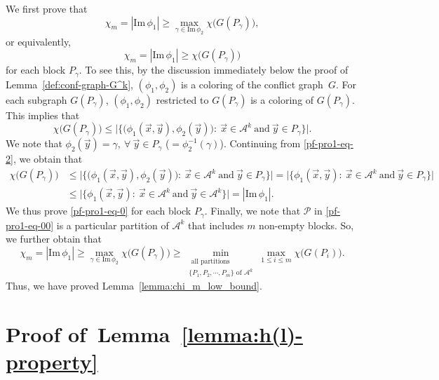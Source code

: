 \documentclass[11pt,draftclsnofoot,onecolumn]{IEEEtran}
\def\Im{\mathrm{Im}}
\begin{document}
 We  first prove that
 \begin{equation*}
\chi_m=|\Im\,\phi_{1}|\geq\max_{\gamma\in\Im\,\phi_{2}}\chi\big(G(P_{\gamma})\big),\label{pf-pro1-eq-1}
\end{equation*}
 or equivalently,
 \begin{equation}
 \chi_m=|\Im\,\phi_{1}|\geq\chi\big(G(P_{\gamma})\big)\label{pf-pro1-eq-0}
 \end{equation}
for each block $P_{\gamma}$. To see this, by the discussion immediately below the  proof of Lemma~\ref{def:conf-graph-G^k},
$(\phi_1,\phi_2)$ is a coloring of the conflict graph~$G$.
 For each subgraph $G(P_{\gamma})$, $(\phi_1,\phi_2)$ restricted to $G(P_{\gamma})$ is a coloring of $G(P_{\gamma})$. This implies that
\begin{equation}
\chi\big(G(P_{\gamma})\big)\leq\big|\big\{\big(\phi_{1}(\vec{x},\vec{y}),\phi_{2}(\vec{y})\big):~\vec{x}\in\mathcal{A}^{k}~\text{and}
~\vec{y}\in P_{\gamma}\big\}\big|.\label{pf-pro1-eq-2}
\end{equation}
We note that $\phi_{2}(\vec{y})=\gamma,~\forall~\vec{y}\in P_{\gamma}$ ($=\phi_{2}^{-1}(\gamma)$).
Continuing from \eqref{pf-pro1-eq-2}, we  obtain that
\begin{align}
\chi\big(G(P_{\gamma})\big)&\leq\big|\big\{\big(\phi_{1}(\vec{x},\vec{y}),\phi_{2}(\vec{y})\big):~\vec{x}\in\mathcal{A}^{k}~\text{and}
~\vec{y}\in P_{\gamma}\big\}\big|=\big|\big\{\phi_{1}(\vec{x},\vec{y}):~\vec{x}\in\mathcal{A}^{k}~\text{and}
~\vec{y}\in P_{\gamma}\big\}\big|\nonumber\\
& \leq\big|\big\{\phi_{1}(\vec{x},\vec{y}):~\vec{x}\in\mathcal{A}^{k}~\text{and}
~\vec{y}\in\mathcal{A}^{k}\big\}\big|=|\Im\,\phi_{1}|.\nonumber%
\end{align}
We thus  prove \eqref{pf-pro1-eq-0} for each block $P_{\gamma}$.
 Finally,  we note that  $\mathcal{P}$ in \eqref{pf-pro1-eq-00} is a particular partition of $\mathcal{A}^{k}$ that includes $m$ non-empty blocks. So, we further obtain that
 \begin{equation}
 \chi_m=|\Im\,\phi_{1}|\geq\max_{\gamma\in\Im\,\phi_{2}}\chi\big(G(P_{\gamma})\big)\geq\min_{\substack{\text{ all partitions }\\\text{$\{P_1,P_2,\cdots,P_m\}$ of $\mathcal{A}^{k}$}}}\max_{1\leq i\leq m}\chi\big(G(P_i)\big).\nonumber%
 \end{equation}
Thus, we have proved Lemma~\ref{lemma:chi_m_low_bound}.


\section{Proof of~Lemma~\ref{lemma:h(l)-property}}\label{appendix-pf-lemma:h(l)-property}
\end{document}
